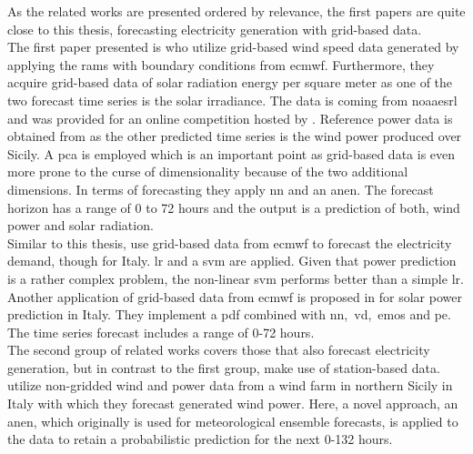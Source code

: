 As the related works are presented ordered by relevance, the first papers are quite close to this thesis, forecasting electricity generation with grid-based data.\\
The first paper presented is  who utilize grid-based wind speed data generated by applying the \gls{rams} with boundary conditions from \gls{ecmwf}. Furthermore, they acquire grid-based data of solar radiation energy per square meter as one of the two forecast time series is the solar irradiance. The data is coming from \gls{noaaesrl} and was provided for an online competition hosted by . Reference power data is obtained from  as the other predicted time series is the wind power produced over Sicily. A \gls{pca} is employed which is an important point as grid-based data is even more prone to the curse of dimensionality because of the two additional dimensions. In terms of forecasting they apply \gls{nn} and an \gls{anen}. The forecast horizon has a range of 0 to 72 hours and the output is a prediction of both, wind power and solar radiation.\\
Similar to this thesis,  use grid-based data from \gls{ecmwf} to forecast the electricity demand, though for Italy. \gls{lr} and a \gls{svm} are applied. Given that power prediction is a rather complex problem, the non-linear \gls{svm} performs better than a simple \gls{lr}.\\
Another application of grid-based data from \gls{ecmwf} is proposed in  for solar power prediction in Italy. They implement a \gls{pdf} combined with \gls{nn},~\gls{vd},~\gls{emos} and \gls{pe}. The time series forecast includes a range of 0-72 hours.\\
The second group of related works covers those that also forecast electricity generation, but in contrast to the first group, make use of station-based data.\\
 utilize non-gridded wind and power data from a wind farm in northern Sicily in Italy with which they forecast generated wind power. Here, a novel approach, an \gls{anen}, which originally is used for meteorological ensemble forecasts, is applied to the data to retain a probabilistic prediction for the next 0-132 hours.\\
